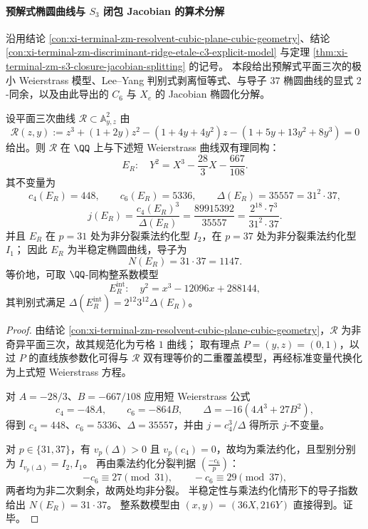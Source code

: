\paragraph{预解式椭圆曲线与 \texorpdfstring{$S_3$}{S3} 闭包 Jacobian 的算术分解}
沿用结论 \ref{con:xi-terminal-zm-resolvent-cubic-plane-cubic-geometry}、结论 \ref{con:xi-terminal-zm-discriminant-ridge-etale-c3-explicit-model} 与定理 \ref{thm:xi-terminal-zm-s3-closure-jacobian-splitting} 的记号。
本段给出预解式平面三次的极小 Weierstrass 模型、Lee--Yang 判别式剥离恒等式、与导子 \(37\) 椭圆曲线的显式 \(2\)-同余，以及由此导出的 \(C_6\) 与 \(X_e\) 的 Jacobian 椭圆化分解。

\begin{theorem}\label{con:xi-resolvent-cubic-short-weierstrass-12096}
设平面三次曲线 \(\mathcal R\subset\mathbb A^2_{y,z}\) 由
\[
\mathscr R(z,y):=z^3+(1+2y)z^2-(1+4y+4y^2)z-(1+5y+13y^2+8y^3)=0
\]
给出。则 \(\mathcal R\) 在 \(\QQ\) 上与下述短 Weierstrass 曲线双有理同构：
\[
E_R:\quad Y^2=X^3-\frac{28}{3}X-\frac{667}{108}.
\]
其不变量为
\[
c_4(E_R)=448,\qquad c_6(E_R)=5336,\qquad \Delta(E_R)=35557=31^2\cdot 37,
\]
\[
j(E_R)=\frac{c_4(E_R)^3}{\Delta(E_R)}=\frac{89915392}{35557}
=\frac{2^{18}\cdot 7^3}{31^2\cdot 37}.
\]
并且 \(E_R\) 在 \(p=31\) 处为非分裂乘法约化型 \(I_2\)，在 \(p=37\) 处为非分裂乘法约化型 \(I_1\)；
因此 \(E_R\) 为半稳定椭圆曲线，导子为
\[
N(E_R)=31\cdot 37=1147.
\]
等价地，可取 \(\QQ\)-同构整系数模型
\[
E_R^{\mathrm{int}}:\quad y^2=x^3-12096x+288144,
\]
其判别式满足 \(\Delta(E_R^{\mathrm{int}})=2^{12}3^{12}\Delta(E_R)\)。
\end{theorem}
\begin{proof}
由结论 \ref{con:xi-terminal-zm-resolvent-cubic-plane-cubic-geometry}，\(\mathcal R\) 为非奇异平面三次，故其规范化为亏格 \(1\) 曲线；
取有理点 \(P=(y,z)=(0,1)\)，以过 \(P\) 的直线族参数化可得与 \(\mathcal R\) 双有理等价的二重覆盖模型，再经标准变量代换化为上式短 Weierstrass 方程。
\par
对 \(A=-28/3\)、\(B=-667/108\) 应用短 Weierstrass 公式
\[
c_4=-48A,\qquad c_6=-864B,\qquad \Delta=-16(4A^3+27B^2),
\]
得到 \(c_4=448\)、\(c_6=5336\)、\(\Delta=35557\)，并由 \(j=c_4^3/\Delta\) 得所示 \(j\)-不变量。
\par
对 \(p\in\{31,37\}\)，有 \(v_p(\Delta)>0\) 且 \(v_p(c_4)=0\)，故均为乘法约化，且型别分别为 \(I_{v_p(\Delta)}=I_2,I_1\)。
再由乘法约化分裂判据 \(\left(\frac{-c_6}{p}\right)\)：
\[
-c_6\equiv 27\pmod{31},\qquad -c_6\equiv 29\pmod{37},
\]
两者均为非二次剩余，故两处均非分裂。
半稳定性与乘法约化情形下的导子指数给出 \(N(E_R)=31\cdot 37\)。
整系数模型由 \((x,y)=(36X,216Y)\) 直接得到。证毕。
\end{proof}

